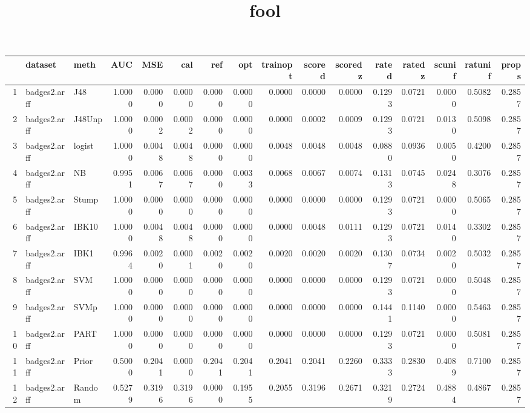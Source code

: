 \documentclass {article}
\begin{document}
 
\title{fool}

 
\tiny

\begin{table}[ht]
\centering
\begingroup\tiny
\begin{tabular}{rllrrrrrrrrrrrrr}
  \hline
 & dataset & meth & AUC & MSE & cal & ref & opt & trainopt & scored & scoredz & rated & ratedz & scunif & ratunif & props \\ 
  \hline
1 & badges2.arff & J48 & 1.0000 & 0.0000 & 0.0000 & 0.0000 & 0.0000 & 0.0000 & 0.0000 & 0.0000 & 0.1293 & 0.0721 & 0.0000 & 0.5082 & 0.2857 \\ 
  2 & badges2.arff & J48Unp & 1.0000 & 0.0002 & 0.0002 & 0.0000 & 0.0000 & 0.0000 & 0.0002 & 0.0009 & 0.1293 & 0.0721 & 0.0130 & 0.5098 & 0.2857 \\ 
  3 & badges2.arff & logist & 1.0000 & 0.0048 & 0.0048 & 0.0000 & 0.0000 & 0.0048 & 0.0048 & 0.0048 & 0.0880 & 0.0936 & 0.0050 & 0.4200 & 0.2857 \\ 
  4 & badges2.arff & NB & 0.9951 & 0.0067 & 0.0067 & 0.0000 & 0.0033 & 0.0068 & 0.0067 & 0.0074 & 0.1313 & 0.0745 & 0.0248 & 0.3076 & 0.2857 \\ 
  5 & badges2.arff & Stump & 1.0000 & 0.0000 & 0.0000 & 0.0000 & 0.0000 & 0.0000 & 0.0000 & 0.0000 & 0.1293 & 0.0721 & 0.0000 & 0.5065 & 0.2857 \\ 
  6 & badges2.arff & IBK10 & 1.0000 & 0.0048 & 0.0048 & 0.0000 & 0.0000 & 0.0000 & 0.0048 & 0.0111 & 0.1293 & 0.0721 & 0.0140 & 0.3302 & 0.2857 \\ 
  7 & badges2.arff & IBK1 & 0.9964 & 0.0020 & 0.0001 & 0.0020 & 0.0020 & 0.0020 & 0.0020 & 0.0020 & 0.1307 & 0.0734 & 0.0020 & 0.5032 & 0.2857 \\ 
  8 & badges2.arff & SVM & 1.0000 & 0.0000 & 0.0000 & 0.0000 & 0.0000 & 0.0000 & 0.0000 & 0.0000 & 0.1293 & 0.0721 & 0.0000 & 0.5048 & 0.2857 \\ 
  9 & badges2.arff & SVMp & 1.0000 & 0.0000 & 0.0000 & 0.0000 & 0.0000 & 0.0000 & 0.0000 & 0.0000 & 0.1441 & 0.1140 & 0.0000 & 0.5463 & 0.2857 \\ 
  10 & badges2.arff & PART & 1.0000 & 0.0000 & 0.0000 & 0.0000 & 0.0000 & 0.0000 & 0.0000 & 0.0000 & 0.1293 & 0.0721 & 0.0000 & 0.5081 & 0.2857 \\ 
  11 & badges2.arff & Prior & 0.5000 & 0.2041 & 0.0000 & 0.2041 & 0.2041 & 0.2041 & 0.2041 & 0.2260 & 0.3333 & 0.2830 & 0.4089 & 0.7100 & 0.2857 \\ 
  12 & badges2.arff & Random & 0.5279 & 0.3196 & 0.3196 & 0.0000 & 0.1955 & 0.2055 & 0.3196 & 0.2671 & 0.3219 & 0.2724 & 0.4884 & 0.4867 & 0.2857 \\ 

\end{tabular}
\end{table}
\end{document}

